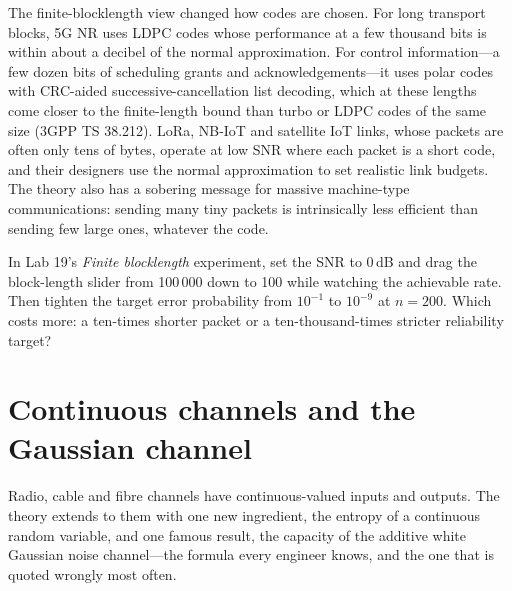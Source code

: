 
\begin{inpractice}
The finite-blocklength view changed how codes are chosen. For long transport blocks, 5G NR uses
LDPC codes whose performance at a few thousand bits is within about a decibel of the
normal approximation. For control information---a few dozen bits of scheduling grants and
acknowledgements---it uses polar codes with CRC-aided successive-cancellation list decoding, which
at these lengths come closer to the finite-length bound than turbo or LDPC codes of the same size
(3GPP TS 38.212). LoRa, NB-IoT and satellite IoT links, whose packets are often only tens of bytes,
operate at low SNR where each packet is a short code, and their designers use the normal
approximation to set realistic link budgets. The theory also has a sobering message for massive
machine-type communications: sending many tiny packets is intrinsically less efficient than
sending few large ones, whatever the code.
\end{inpractice}

\begin{tryit}
In Lab 19's \emph{Finite blocklength} experiment, set the SNR to 0\,dB and drag the block-length
slider from 100\,000 down to 100 while watching the achievable rate. Then tighten the target error
probability from $10^{-1}$ to $10^{-9}$ at $n=200$. Which costs more: a ten-times shorter packet or
a ten-thousand-times stricter reliability target?
\end{tryit}

\section{Continuous channels and the Gaussian channel}
\label{sec:ch13:awgn}

Radio, cable and fibre channels have continuous-valued inputs and outputs. The theory extends to
them with one new ingredient, the entropy of a continuous random variable, and one famous
result, the capacity of the additive white Gaussian noise channel---the formula every engineer
knows, and the one that is quoted wrongly most often.

